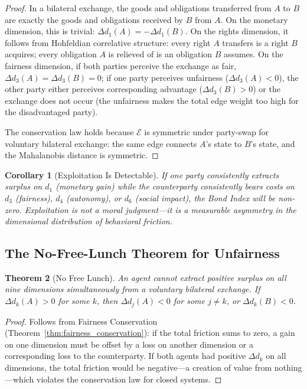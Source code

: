 \documentclass[12pt]{article}
\newtheorem{theorem}{Theorem}[section]
\newtheorem{corollary}[theorem]{Corollary}
\theoremstyle{definition}
\theoremstyle{remark}
\newcommand{\E}{\mathcal{E}}               %
\begin{document}
\begin{proof}
In a bilateral exchange, the goods and obligations transferred from $A$ to $B$ are exactly the goods and obligations received by $B$ from $A$.  On the monetary dimension, this is trivial: $\Delta d_1(A) = -\Delta d_1(B)$.  On the rights dimension, it follows from Hohfeldian correlative structure: every right $A$ transfers is a right $B$ acquires; every obligation $A$ is relieved of is an obligation $B$ assumes.  On the fairness dimension, if both parties perceive the exchange as fair, $\Delta d_3(A) = \Delta d_3(B) = 0$; if one party perceives unfairness ($\Delta d_3(A) < 0$), the other party either perceives corresponding advantage ($\Delta d_3(B) > 0$) or the exchange does not occur (the unfairness makes the total edge weight too high for the disadvantaged party).

The conservation law holds because $\E$ is symmetric under party-swap for voluntary bilateral exchange: the same edge connects $A$'s state to $B$'s state, and the Mahalanobis distance is symmetric.
\end{proof}

\begin{corollary}[Exploitation Is Detectable]
If one party consistently extracts surplus on $d_1$ (monetary gain) while the counterparty consistently bears costs on $d_3$ (fairness), $d_4$ (autonomy), or $d_6$ (social impact), the Bond Index will be non-zero.  Exploitation is not a moral judgment---it is a \emph{measurable asymmetry} in the dimensional distribution of behavioral friction.
\end{corollary}

\subsection{The No-Free-Lunch Theorem for Unfairness}

\begin{theorem}[No Free Lunch]
\label{thm:no_free_lunch}
An agent cannot extract positive surplus on all nine dimensions simultaneously from a voluntary bilateral exchange.  If $\Delta d_k(A) > 0$ for some $k$, then $\Delta d_j(A) < 0$ for some $j \neq k$, or $\Delta d_k(B) < 0$.
\end{theorem}

\begin{proof}
Follows from Fairness Conservation (Theorem~\ref{thm:fairness_conservation}): if the total friction sums to zero, a gain on one dimension must be offset by a loss on another dimension or a corresponding loss to the counterparty.  If both agents had positive $\Delta d_k$ on all dimensions, the total friction would be negative---a creation of value from nothing---which violates the conservation law for closed systems.
\end{proof}
\end{document}
